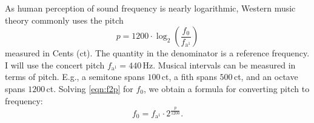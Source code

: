 \documentclass[a4paper]{article}
\begin{document}
As human perception of sound frequency is nearly logarithmic, Western music
theory commonly uses the pitch
\begin{equation}
  \label{eqn:f2p}
  p = 1200\cdot\log_2\!\left(\dfrac{f_0}{f_{\text{a}^1}}\right)
\end{equation}
measured in Cents (ct). The quantity in the denominator is a reference
frequency. I will use the concert pitch $f_{\text{a}^1}=440\,$Hz. Musical
intervals can be measured in terms of pitch. E.g., a semitone spans $100$\,ct, a
fith spans $500$\,ct, and an octave spans $1200$\,ct. Solving \cref{eqn:f2p}
for $f_0$, we obtain a formula for converting pitch to frequency:
\begin{equation}
  \label{eqn:p2f}
  f_0 = f_{\text{a}^1}\cdot 2^{\frac{p}{1200}}.
\end{equation}
\end{document}
